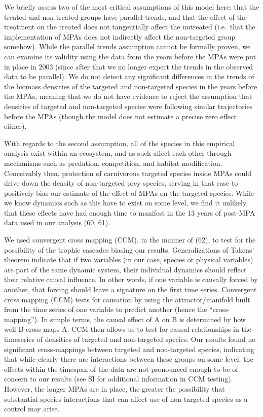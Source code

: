 \documentclass[9pt,twocolumn,twoside,lineno]{pnas-new}
\begin{document}
We briefly assess two of the most critical assumptions of this model
here: that the treated and non-treated groups have parallel trends, and
that the effect of the treatment on the treated does not tangentially
affect the untreated (i.e.~that the implementation of MPAs does not
indirectly affect the non-targeted group somehow). While the parallel
trends assumption cannot be formally proven, we can examine its validity
using the data from the years before the MPAs were put in place in 2003
(since after that we no longer expect the trends in the observed data to
be parallel). We do not detect any significant differences in the trends
of the biomass densities of the targeted and non-targeted species in the
years before the MPAs, meaning that we do not have evidence to reject
the assumption that densities of targeted and non-targeted species were
following similar trajectories before the MPAs (though the model does
not estimate a precise zero effect either).

With regards to the second assumption, all of the species in this
empirical analysis exist within an ecosystem, and as such affect each
other through mechanisms such as predation, competition, and habitat
modification. Conceivably then, protection of carnivorous targeted
species inside MPAs could drive down the density of non-targeted prey
species, serving in that case to positively bias our estimate of the
effect of MPAs on the targeted species. While we know dynamics such as
this have to exist on some level, we find it unlikely that these effects
have had enough time to manifest in the 13 years of post-MPA data used
in our analysis (60, 61).

We used convergent cross mapping (CCM), in the manner of (62), to test
for the possibility of the trophic cascades biasing our results.
Generalizations of Takens' theorem indicate that if two variables (in
our case, species or physical variables) are part of the same dynamic
system, their individual dynamics should reflect their relative causal
influence. In other words, if one variable is causally forced by
another, that forcing should leave a signature on the first time series.
Convergent cross mapping (CCM) tests for causation by using the
attractor/manifold built from the time series of one variable to predict
another (hence the ``cross-mapping''). In simple terms, the causal
effect of A on B is determined by how well B cross-maps A. CCM then
allows us to test for causal relationships in the timeseries of
densities of targeted and non-targeted species. Our results found no
significant cross-mappings between targeted and non-targeted species,
indicating that while clearly there are interactions between these
groups on some level, the effects within the timespan of the data are
not pronounced enough to be of concern to our results (see SI for
additional information in CCM testing). However, the longer MPAs are in
place, the greater the possibility that substantial species interactions
that can affect use of non-targeted species as a control may arise.
\end{document}
